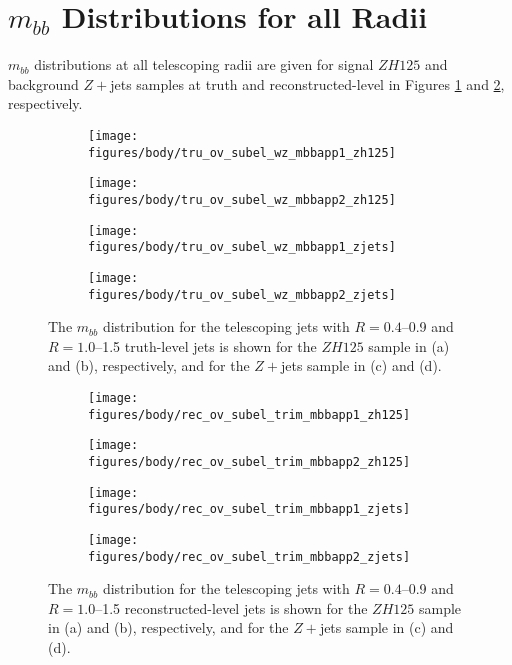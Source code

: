 \section{$m_{bb}$ Distributions for all Radii}
\label{sec:mbball}
$m_{bb}$ distributions at all telescoping radii are given for signal $ZH125$ and background $Z+$jets samples at truth and reconstructed-level in Figures \ref{fig:allradtru} and \ref{fig:allradrec}, respectively.
\begin{figure}[!htbp]\captionsetup{justification=centering}
\begin{center}
\begin{subfigure}[t]{16pc}\centering\texttt{[image: figures/body/tru\_ov\_subel\_wz\_mbbapp1\_zh125]}\caption{}\end{subfigure}
\begin{subfigure}[t]{16pc}\centering\texttt{[image: figures/body/tru\_ov\_subel\_wz\_mbbapp2\_zh125]}\caption{}\end{subfigure}
\begin{subfigure}[t]{16pc}\centering\texttt{[image: figures/body/tru\_ov\_subel\_wz\_mbbapp1\_zjets]}\caption{}\end{subfigure}
\begin{subfigure}[t]{16pc}\centering\texttt{[image: figures/body/tru\_ov\_subel\_wz\_mbbapp2\_zjets]}\caption{}\end{subfigure}
\caption{\label{fig:allradtru}The $m_{bb}$ distribution for the telescoping jets with $R=0.4$--0.9 and $R=1.0$--1.5 truth-level jets is shown for the $ZH125$ sample in (a) and (b), respectively, and for the $Z+$jets sample in (c) and (d).}
\end{center}
\end{figure}

\begin{figure}[!htbp]\captionsetup{justification=centering}
\begin{center}
\begin{subfigure}[t]{16pc}\centering\texttt{[image: figures/body/rec\_ov\_subel\_trim\_mbbapp1\_zh125]}\caption{}\end{subfigure}
\begin{subfigure}[t]{16pc}\centering\texttt{[image: figures/body/rec\_ov\_subel\_trim\_mbbapp2\_zh125]}\caption{}\end{subfigure}
\begin{subfigure}[t]{16pc}\centering\texttt{[image: figures/body/rec\_ov\_subel\_trim\_mbbapp1\_zjets]}\caption{}\end{subfigure}
\begin{subfigure}[t]{16pc}\centering\texttt{[image: figures/body/rec\_ov\_subel\_trim\_mbbapp2\_zjets]}\caption{}\end{subfigure}
\caption{\label{fig:allradrec}The $m_{bb}$ distribution for the telescoping jets with $R=0.4$--0.9 and $R=1.0$--1.5 reconstructed-level jets is shown for the $ZH125$ sample in (a) and (b), respectively, and for the $Z+$jets sample in (c) and (d).}
\end{center}
\end{figure}

